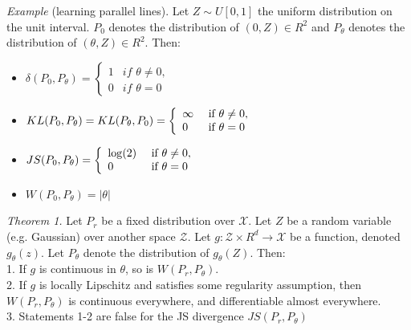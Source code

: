 \documentclass[english]{article}
\begin{document}
\item { \emph{Example} (learning parallel lines)}.
Let $Z\sim U[0,1]$ the uniform distribution on the unit interval. $P_0$ denotes the distribution of $(0,Z)\in R^2$ and $P_\theta$ denotes the distribution of $(\theta,Z)\in R^2$. Then:
\begin{itemize}
     \item $\delta(P_0,P_\theta)=\left\{ \begin{array}{ll}
             1 & if \,\, \theta \not= 0,\\
             0 & if \,\, \theta =0 \end{array}\right.$
     
   \end{itemize}






\item {}
\begin{itemize}
     \item $KL(P_0,P_\theta)=KL(P_\theta, P_0)=\left\{ \begin{array}{ll}
             \infty & \textnormal{ if } \theta \not= 0,\\
             0 & \textnormal{ if } \theta =0 \end{array}\right.$
    \item $ JS(P_0,P_\theta)=\left\{ \begin{array}{ll}
             \log(2) & \textnormal{ if } \theta \not= 0,\\
             0 & \textnormal{ if } \theta =0 \end{array}\right.$
   \item $ W(P_0,P_\theta)= |\theta|$
\end{itemize}





\item {\emph{Theorem 1.}}
 Let $P_r$ be a fixed distribution over $\mathcal{X}$. Let $Z$ be a random variable (e.g. Gaussian) over another space $\mathcal{Z}$. Let $g: \mathcal{Z}\times R^d \rightarrow \mathcal{X}$ be a function, denoted $g_\theta (z)$. Let $P_\theta$ denote the distribution of $g_\theta (Z)$. Then:\\
 1. If $g$ is continuous in $\theta$, so is $W(P_r,P_\theta)$.\\
 2. If $g$ is locally Lipschitz and satisfies some regularity assumption, then $W(P_r,P_\theta)$ is continuous everywhere, and differentiable almost everywhere.\\
 3. Statements 1-2 are false for the JS divergence $JS(P_r,P_\theta)$
\end{document}
